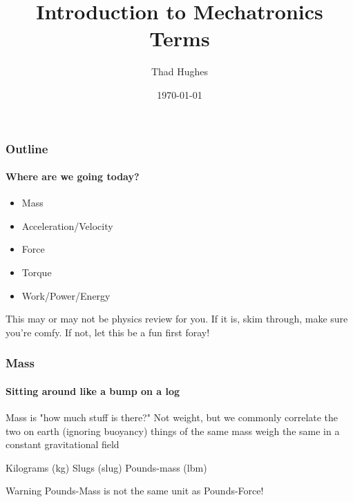 \documentclass{beamer}%
\title{Introduction to Mechatronics Terms}
\author{Thad Hughes}
\date{\today}
\begin{document}
\maketitle

\begin{frame}
\frametitle{Outline}
\framesubtitle{Where are we going today?}

\begin{itemize}
	\item Mass
	\item Acceleration/Velocity
	\item Force
	\item Torque
	\item Work/Power/Energy
\end{itemize}

\begin{block}
	This may or may not be physics review for you. If it is, skim through, make sure you're comfy. If not, let this be a fun first foray!
\end{block}

\end{frame}



\begin{frame}
\frametitle{Mass}
\framesubtitle{Sitting around like a bump on a log}

\begin{outline}
	\1 Mass is "how much stuff is there?"
	\1 Not weight, but we commonly correlate the two on earth
		\2 (ignoring buoyancy) things of the same mass weigh the same in a constant gravitational field
\end{outline}

\begin{examples}
\begin{outline}
	\1 Kilograms (kg)
	\1 Slugs (slug)
	\1 Pounds-mass (lbm)
\end{outline}
\end{examples}

\begin{alertblock}{Warning}
	Pounds-Mass is not the same unit as Pounds-Force!
\end{alertblock}

\end{frame}
\end{document}
